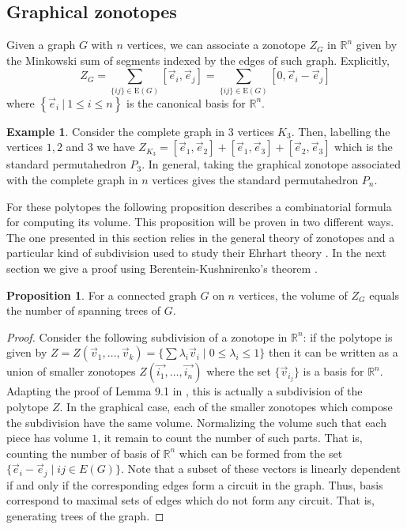 \documentclass[english,11pt]{article}
\theoremstyle{definition}
\theoremstyle{definition}
\newtheorem{proposition}{Proposition}[section]
\theoremstyle{definition}
\newtheorem{example}{Example}[section]
\theoremstyle{remark}
\theoremstyle{definition}
\begin{document}
\subsection{Graphical zonotopes}

Given a graph $G$ with $n$ vertices, we can associate a zonotope $Z_G$ in $\mathbb{R}^n$ given by the Minkowski sum of segments indexed by the edges of such graph. Explicitly, $$Z_G = \sum_{\{ij\}\in\text{E}(G)}\left[\vec{e}_i,\vec{e}_j\right] = \sum_{\{ij\}\in\text{E}(G)}\left[0,\vec{e}_i-\vec{e}_j\right]$$
where $\left\{\vec{e}_i \ | \ 1\leq i\leq n \right\}$ is the canonical basis for $\mathbb{R}^n$. 

\begin{example}
Consider the complete graph in 3 vertices $K_3$. Then, labelling the vertices $1, 2$ and $3$ we have $Z_{K_3} = \left[\vec{e}_1,\vec{e}_2\right]+\left[\vec{e}_1,\vec{e}_3\right]+\left[\vec{e}_2,\vec{e}_3\right]$ which is the standard permutahedron $P_3$. In general, taking the graphical zonotope associated with the complete graph in $n$ vertices gives the standard permutahedron $P_n$. 
\end{example}

For these polytopes the following proposition describes a combinatorial formula for computing its volume. This proposition will be proven in two different ways. The one presented in this section relies in the general theory of zonotopes and a particular kind of subdivision used to study their Ehrhart theory \cite{beck2008computing}. In the next section we give a proof using Berentein-Kushnirenko's theorem \cite{Ber-Kush}. 

\begin{proposition}
For a connected graph $G$ on $n$ vertices, the volume of $Z_G$ equals the number of spanning trees of $G$. 
\end{proposition}

\begin{proof}
Consider the following subdivision of a zonotope in $\mathbb{R}^n$: if the polytope is given by $Z = Z(\vec{v}_1,\ldots,\vec{v}_k) = \{ \sum \lambda_i \vec{v}_i \mid 0 \leq \lambda_i \leq 1\}$ then it can be written as a union of smaller zonotopes $Z(\vec{i_1},\ldots,\vec{i_n})$ where the set $\{\vec{v}_{i_j}\}$ is a basis for $\mathbb{R}^n$. Adapting the proof of Lemma 9.1 in \cite{beck2008computing}, this is actually a subdivision of the polytope $Z$. In the graphical case, each of the smaller zonotopes which compose the subdivision have the same volume. Normalizing the volume such that each piece has volume $1$, it remain to count the number of such parts. That is, counting the number of basis of $\mathbb{R}^n$ which can be formed from the set $\{ \vec{e}_i - \vec{e}_j \mid ij\in E(G)\}$. Note that a subset of these vectors is linearly dependent if and only if the corresponding edges form a circuit in the graph. Thus, basis correspond to maximal sets of edges which do not form any circuit. That is, generating trees of the graph.
\end{proof}
\end{document}
